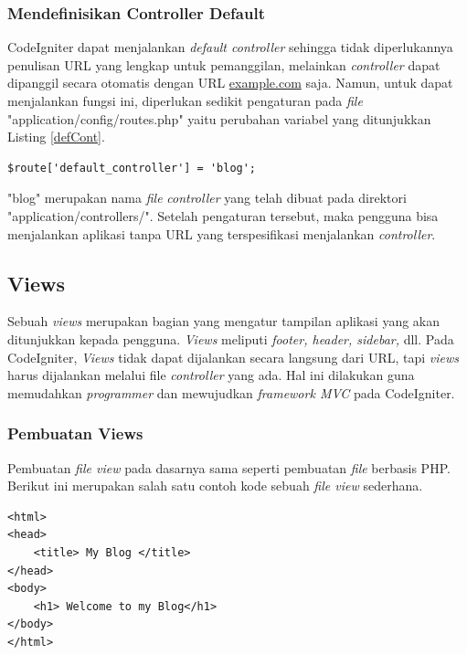 \subsubsection{Mendefinisikan Controller Default}
\label{subsub: defaulController}

	CodeIgniter dapat menjalankan \textit{default controller} sehingga tidak diperlukannya penulisan URL yang lengkap untuk pemanggilan, melainkan \textit{controller} dapat dipanggil secara otomatis dengan URL \url{example.com} saja. Namun, untuk dapat menjalankan fungsi ini, diperlukan sedikit pengaturan pada \textit{file} "application/config/routes.php" yaitu perubahan variabel yang ditunjukkan Listing \ref{defCont}.
	
	\begin{lstlisting}[caption= Default Controller, label= defCont]
	$route['default_controller'] = 'blog';
	\end{lstlisting}
	
	"blog" merupakan nama \textit{file} \textit{controller} yang telah dibuat pada direktori "application/controllers/". Setelah pengaturan tersebut, maka pengguna bisa menjalankan aplikasi tanpa URL yang terspesifikasi menjalankan \textit{controller}.
	
	\subsection{Views}
	\label{sub: views}
	
	Sebuah \textit{views} merupakan bagian yang mengatur tampilan aplikasi yang akan ditunjukkan kepada pengguna. \textit{Views} meliputi \textit{footer, header, sidebar,} dll.
	Pada CodeIgniter, \textit{Views} tidak dapat dijalankan secara langsung dari URL, tapi \textit{views} harus dijalankan melalui file \textit{controller} yang ada. Hal ini dilakukan guna memudahkan \textit{programmer} dan mewujudkan \textit{framework MVC} pada CodeIgniter.
	
	\subsubsection{Pembuatan Views}
	\label{subsub: pembuatanView}
	
	Pembuatan \textit{file view} pada dasarnya sama seperti pembuatan \textit{file} berbasis PHP. Berikut ini merupakan salah satu contoh kode sebuah \textit{file view} sederhana.
	
	\begin{lstlisting}[caption={File View}, label={fileView}]
<html>
<head>
	<title> My Blog </title>
</head>
<body>
	<h1> Welcome to my Blog</h1>
</body>
</html>
	\end{lstlisting}
	
